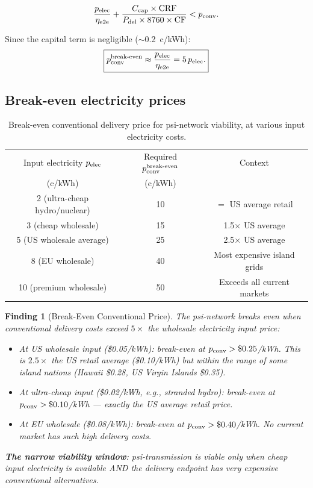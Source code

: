 \documentclass[11pt]{article}
\newtheorem{finding}{Finding}
\begin{document}
\begin{equation}
\frac{p_{\rm elec}}{\eta_{\rm e2e}} + \frac{C_{\rm cap}\times\text{CRF}}
{P_{\rm del}\times 8760\times\text{CF}} < p_{\rm conv}.
\label{eq:breakeven}
\end{equation}

Since the capital term is negligible ($\sim$0.2~c/kWh):
\begin{equation}
\boxed{
p_{\rm conv}^{\rm break\text{-}even} \approx
\frac{p_{\rm elec}}{\eta_{\rm e2e}} = 5\,p_{\rm elec}.
}
\label{eq:breakeven-simple}
\end{equation}

\subsection{Break-even electricity prices}

\begin{table}[h]
\centering
\caption{Break-even conventional delivery price for psi-network viability,
at various input electricity costs.}
\label{tab:breakeven}
\begin{tabular}{ccc}
\toprule
Input electricity $p_{\rm elec}$ & Required $p_{\rm conv}^{\rm break\text{-}even}$
  & Context \\
 (c/kWh) & (c/kWh) & \\
\midrule
2 (ultra-cheap hydro/nuclear) & 10 & $= $ US average retail \\
3 (cheap wholesale) & 15 & 1.5$\times$ US average \\
5 (US wholesale average) & 25 & 2.5$\times$ US average \\
8 (EU wholesale) & 40 & Most expensive island grids \\
10 (premium wholesale) & 50 & Exceeds all current markets \\
\bottomrule
\end{tabular}
\end{table}

\begin{finding}[Break-Even Conventional Price]
\label{find:breakeven}
The psi-network breaks even when conventional delivery costs exceed
$5\times$ the wholesale electricity input price:

\begin{itemize}[nosep]
  \item At US wholesale input (\$0.05/kWh): break-even at $p_{\rm conv}
    > \$0.25$/kWh. This is $2.5\times$ the US retail average (\$0.10/kWh)
    but within the range of some island nations (Hawaii \$0.28, US Virgin
    Islands \$0.35).
  \item At ultra-cheap input (\$0.02/kWh, e.g., stranded hydro):
    break-even at $p_{\rm conv} > \$0.10$/kWh --- exactly the US average
    retail price.
  \item At EU wholesale (\$0.08/kWh): break-even at $p_{\rm conv}
    > \$0.40$/kWh. No current market has such high delivery costs.
\end{itemize}

\textbf{The narrow viability window}: psi-transmission is viable only
when cheap input electricity is available AND the delivery endpoint has
very expensive conventional alternatives.
\end{finding}
\end{document}
